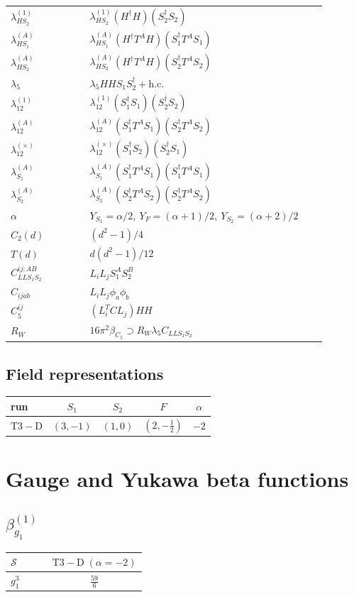 \documentclass[9pt]{article}
\begin{document}
\begin{longtable}{@{}p{0.23\linewidth}p{0.69\linewidth}@{}}
$\lambda_{HS_2}^{(1)}$ & $\lambda_{HS_2}^{(1)}(H^\dagger H)(S_2^\dagger S_2)$ \\
$\lambda_{HS_1}^{(A)}$ & $\lambda_{HS_1}^{(A)}(H^\dagger T^AH)(S_1^\dagger T^AS_1)$ \\
$\lambda_{HS_2}^{(A)}$ & $\lambda_{HS_2}^{(A)}(H^\dagger T^AH)(S_2^\dagger T^AS_2)$ \\
$\lambda_5$ & $\lambda_5HHS_1S_2^\dagger+\mathrm{h.c.}$ \\
$\lambda_{12}^{(1)}$ & $\lambda_{12}^{(1)}(S_1^\dagger S_1)(S_2^\dagger S_2)$ \\
$\lambda_{12}^{(A)}$ & $\lambda_{12}^{(A)}(S_1^\dagger T^AS_1)(S_2^\dagger T^AS_2)$ \\
$\lambda_{12}^{(\times)}$ & $\lambda_{12}^{(\times)}(S_1^\dagger S_2)(S_2^\dagger S_1)$ \\
$\lambda_{S_1}^{(A)}$ & $\lambda_{S_1}^{(A)}(S_1^\dagger T^A S_1)(S_1^\dagger T^A S_1)$ \\
$\lambda_{S_2}^{(A)}$ & $\lambda_{S_2}^{(A)}(S_2^\dagger T^A S_2)(S_2^\dagger T^A S_2)$ \\
$\alpha$ & $Y_{S_1}=\alpha/2,\ Y_F=(\alpha+1)/2,\ Y_{S_2}=(\alpha+2)/2$ \\
$C_2(d)$ & $(d^2-1)/4$ \\
$T(d)$ & $d(d^2-1)/12$ \\
$C_{LLS_1S_2}^{ij;AB}$ & $L_iL_jS_1^AS_2^B$ \\
$C_{ijab}$ & $L_iL_j\phi_a\phi_b$ \\
$C_5^{ij}$ & $(L_i^TCL_j)HH$ \\
$R_W$ & $16\pi^2\beta_{C_5}\supset R_W\lambda_5C_{LLS_1S_2}$ \\
\bottomrule
\end{longtable}
\subsection*{Field representations}
\begin{longtable}{@{}lcccc@{}}
\toprule
run & $S_1$ & $S_2$ & $F$ & $\alpha$ \\
\midrule
$\mathrm{T3-D}$ & $(3,-1)$ & $(1,0)$ & $(2,- \frac{1}{2})$ & $-2$ \\
\bottomrule
\end{longtable}
\section*{Gauge and Yukawa beta functions}
\subsection*{$ \beta_{g_1}^{(1)} $}
\begin{longtable}{@{}p{0.38\linewidth}c@{}}
\toprule
$\mathcal{S}$ & $ \mathrm{T3-D}\;(\alpha=-2) $ \\
\midrule
$ g_1^3 $ & $ \frac{59}{6} $ \\
\bottomrule
\end{longtable}
\end{document}
